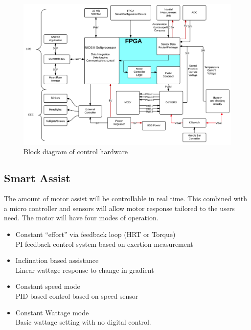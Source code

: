 \documentclass[12pt,article]{IEEEtran}
\begin{document}
    \begin{figure}[t]
        \includegraphics[width=\textwidth]{SystemDiagram}
        \caption{Block diagram of control hardware}
    \end{figure}
    
    \subsection{\bfseries Smart Assist}
            The amount of motor assist will be controllable in real time. This combined with a micro controller 
            and sensors will allow motor response tailored to the users need. The motor will have four modes of operation.
        \begin{itemize}
        \item Constant “effort” via feedback loop (HRT or Torque) \hfill \\
            PI feedback control system based on exertion measurement
    
        \item Inclination based assistance \hfill \\
           Linear wattage response to change in gradient
    
        \item Constant speed mode \hfill \\
            PID based control based on speed sensor
    
        \item Constant Wattage mode \hfill \\
         Basic wattage setting with no digital control.
        \end{itemize}
        
\end{document}
